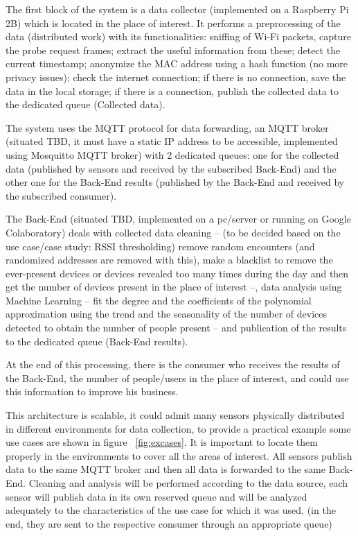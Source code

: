 The first block of the system is a data collector (implemented on a Raspberry Pi 2B) which is located in the place of interest. It performs a preprocessing of the data (distributed work) with its functionalities: sniffing of Wi-Fi packets, capture the probe request frames; extract the useful information from these; detect the current timestamp; anonymize the MAC address using a hash function (no more privacy issues); check the internet connection; if there is no connection, save the data in the local storage; if there is a connection, publish the collected data to the dedicated queue (Collected data).

The system uses the MQTT protocol for data forwarding, an MQTT broker (situated TBD, it must have a static IP address to be accessible, implemented using Mosquitto MQTT broker) with 2 dedicated queues: one for the collected data (published by sensors and received by the subscribed Back-End) and the other one for the Back-End results (published by the Back-End and received by the subscribed consumer).

The Back-End (situated TBD, implemented on a pc/server or running on Google Colaboratory) deals with collected data cleaning -- (to be decided based on the use case/case study: RSSI thresholding) remove random encounters (and randomized addresses are removed with this), make a blacklist to remove the ever-present devices or devices revealed too many times during the day and then get the number of devices present in the place of interest --, data analysis using Machine Learning -- fit the degree and the coefficients of the polynomial approximation using the trend and the seasonality of the number of devices detected to obtain the number of people present -- and publication of the results to the dedicated queue (Back-End results).

At the end of this processing, there is the consumer who receives the results of the Back-End, the number of people/users in the place of interest, and could use this information to improve his business.

This architecture is scalable, it could admit many sensors physically distributed in different environments for data collection, to provide a practical example some use cases are shown in figure ~\ref{fig:excases}. It is important to locate them properly in the environments to cover all the areas of interest. All sensors publish data to the same MQTT broker and then all data is forwarded to the same Back-End. Cleaning and analysis will be performed according to the data source, each sensor will publish data in its own reserved queue and will be analyzed adequately to the characteristics of the use case for which it was used. (in the end, they are sent to the respective consumer through an appropriate queue)

